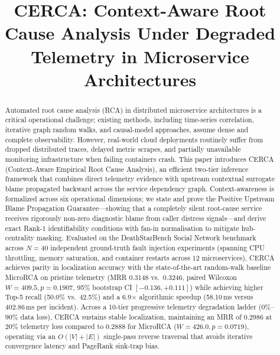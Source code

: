 \documentclass[conference]{IEEEtran}
\begin{document}
\title{CERCA: Context-Aware Root Cause Analysis Under Degraded Telemetry in Microservice Architectures}

\author{
\and
{}
}

\maketitle

\begin{abstract}
Automated root cause analysis (RCA) in distributed microservice architectures is a critical operational challenge; existing methods, including time-series correlation, iterative graph random walks, and causal-model approaches, assume dense and complete observability. However, real-world cloud deployments routinely suffer from dropped distributed traces, delayed metric scrapes, and partially unavailable monitoring infrastructure when failing containers crash. This paper introduces CERCA (Context-Aware Empirical Root Cause Analysis), an efficient two-tier inference framework that combines direct telemetry evidence with upstream contextual surrogate blame propagated backward across the service dependency graph. Context-awareness is formalized across six operational dimensions; we state and prove the Positive Upstream Blame Propagation Guarantee---showing that a completely silent root-cause service receives rigorously non-zero diagnostic blame from caller distress signals---and derive exact Rank-1 identifiability conditions with fan-in normalisation to mitigate hub-centrality masking. Evaluated on the DeathStarBench Social Network benchmark across $N = 40$ independent ground-truth fault injection experiments (spanning CPU throttling, memory saturation, and container restarts across 12 microservices), CERCA achieves parity in localization accuracy with the state-of-the-art random-walk baseline MicroRCA on pristine telemetry (MRR 0.3148 vs.\ 0.3246, paired Wilcoxon $W = 409.5, p = 0.1907$, 95\% bootstrap CI $[-0.136, +0.111]$) while achieving higher Top-5 recall (50.0\% vs.\ 42.5\%) and a 6.9$\times$ algorithmic speedup (58.10\,ms versus 402.86\,ms per incident). Across a 10-tier progressive telemetry degradation ladder (0\%--90\% data loss), CERCA sustains stable localization, maintaining an MRR of 0.2986 at 20\% telemetry loss compared to 0.2888 for MicroRCA ($W = 426.0, p = 0.0719$), operating via an $O(|V| + |E|)$ single-pass reverse traversal that avoids iterative convergence latency and PageRank sink-trap bias.
\end{abstract}
\end{document}
